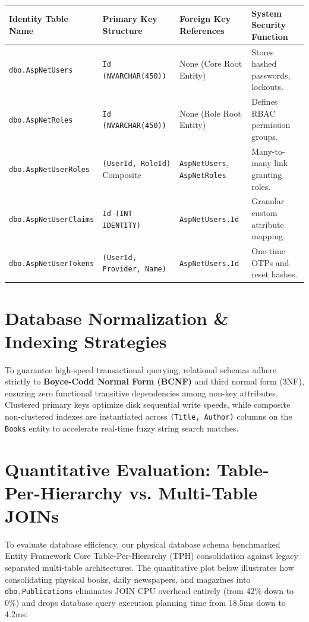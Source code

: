\documentclass[11pt,a4paper]{report}
\begin{document}
\vspace{10pt}
\noindent
\begin{center}
\renewcommand{\arraystretch}{1.25}
\begin{tabular}{|L{3.6cm}|L{3.4cm}|L{3.8cm}|L{4.2cm}|}
\hline
{}
\textbf{\color{white}Identity Table Name} & \textbf{\color{white}Primary Key Structure} & \textbf{\color{white}Foreign Key References} & \textbf{\color{white}System Security Function} \\
\hline
\texttt{dbo.AspNetUsers} & \texttt{Id (NVARCHAR(450))} & None (Core Root Entity) & Stores hashed passwords, lockouts. \\
\hline
{}
\texttt{dbo.AspNetRoles} & \texttt{Id (NVARCHAR(450))} & None (Role Root Entity) & Defines RBAC permission groups. \\
\hline
\texttt{dbo.AspNetUserRoles} & \texttt{(UserId, RoleId)} Composite & \texttt{AspNetUsers}, \texttt{AspNetRoles} & Many-to-many link granting roles. \\
\hline
{}
\texttt{dbo.AspNetUserClaims} & \texttt{Id (INT IDENTITY)} & \texttt{AspNetUsers.Id} & Granular custom attribute mapping. \\
\hline
\texttt{dbo.AspNetUserTokens} & \texttt{(UserId, Provider, Name)} & \texttt{AspNetUsers.Id} & One-time OTPs and reset hashes. \\
\hline
\end{tabular}
\end{center}

\section{Database Normalization \& Indexing Strategies}
To guarantee high-speed transactional querying, relational schemas adhere strictly to \textbf{Boyce-Codd Normal Form (BCNF)} and third normal form (3NF), ensuring zero functional transitive dependencies among non-key attributes. Clustered primary keys optimize disk sequential write speeds, while composite non-clustered indexes are instantiated across \texttt{(Title, Author)} columns on the \texttt{Books} entity to accelerate real-time fuzzy string search matches.

\section{Quantitative Evaluation: Table-Per-Hierarchy vs. Multi-Table JOINs}
To evaluate database efficiency, our physical database schema benchmarked Entity Framework Core Table-Per-Hierarchy (TPH) consolidation against legacy separated multi-table architectures. The quantitative plot below illustrates how consolidating physical books, daily newspapers, and magazines into \texttt{dbo.Publications} eliminates JOIN CPU overhead entirely (from 42\% down to 0\%) and drops database query execution planning time from 18.5ms down to 4.2ms:
\end{document}
